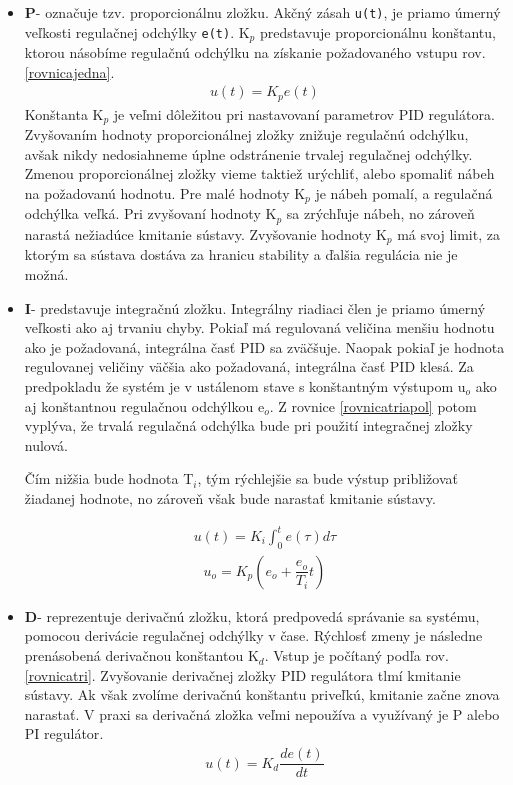 \begin{itemize}
	\item \textbf{P}- označuje tzv. proporcionálnu zložku. Akčný zásah \verb|u(t)|, je priamo úmerný veľkosti regulačnej odchýlky \verb|e(t)|. K$_p$ predstavuje proporcionálnu konštantu, ktorou násobíme regulačnú odchýlku na získanie požadovaného vstupu rov.\ref{rovnicajedna}. 
	\begin{align}
		\label{rovnicajedna}
		u(t)=K_p e(t)
	\end{align}
	Konštanta K$_p$ je veľmi dôležitou pri nastavovaní parametrov PID regulátora. Zvyšovaním hodnoty proporcionálnej zložky znižuje regulačnú odchýlku, avšak nikdy nedosiahneme úplne odstránenie trvalej regulačnej odchýlky. Zmenou proporcionálnej zložky vieme taktiež urýchliť, alebo spomaliť nábeh na požadovanú hodnotu. Pre malé hodnoty K$_p$ je nábeh pomalí, a regulačná odchýlka veľká. Pri zvyšovaní hodnoty K$_p$ sa zrýchľuje nábeh, no zároveň narastá nežiadúce kmitanie sústavy. Zvyšovanie hodnoty K$_p$ má svoj limit, za ktorým sa sústava dostáva za hranicu stability a ďalšia regulácia nie je možná. 
	
	\item \textbf{I}- predstavuje integračnú zložku. Integrálny riadiaci člen je priamo úmerný veľkosti ako aj trvaniu chyby. Pokiaľ má regulovaná veličina menšiu hodnotu ako je požadovaná, integrálna časť PID sa zväčšuje. Naopak pokiaľ je hodnota regulovanej veličiny väčšia ako požadovaná, integrálna časť PID klesá. Za predpokladu že systém je v ustálenom stave s konštantným výstupom u$_o$ ako aj konštantnou regulačnou odchýlkou e$_o$. Z rovnice \ref{rovnicatriapol} potom vyplýva, že trvalá regulačná odchýlka bude pri použití integračnej zložky nulová\cite{PIDcko}. 
	
	Čím nižšia bude hodnota T$_i$, tým rýchlejšie sa bude výstup približovať žiadanej hodnote, no zároveň však bude narastať kmitanie sústavy.   
	
	\begin{align}
		\label{rovnicadva}
		u(t)=K_i  \int_{0}^{t} e(\tau)d\tau  
	\end{align}
	\begin{align}
	\label{rovnicatriapol}
	u_o = K_p \left(e_o + \dfrac{e_o}{T_i}t\right)
    \end{align}
	
	\item \textbf{D}- reprezentuje derivačnú zložku, ktorá predpovedá správanie sa systému, pomocou derivácie regulačnej odchýlky v čase. Rýchlosť zmeny je následne prenásobená derivačnou konštantou K$_d$. Vstup je počítaný podľa rov.\ref{rovnicatri}. Zvyšovanie derivačnej zložky PID regulátora tlmí kmitanie sústavy. Ak však zvolíme derivačnú konštantu priveľkú, kmitanie začne znova narastať\cite{PIDcko}. V praxi sa derivačná zložka veľmi nepoužíva a využívaný je P alebo PI regulátor\cite{1453566}. 
	\begin{align}
		\label{rovnicatri}
		u(t)=K_d  \dfrac{de(t)}{dt}
	\end{align}

\end{itemize}

